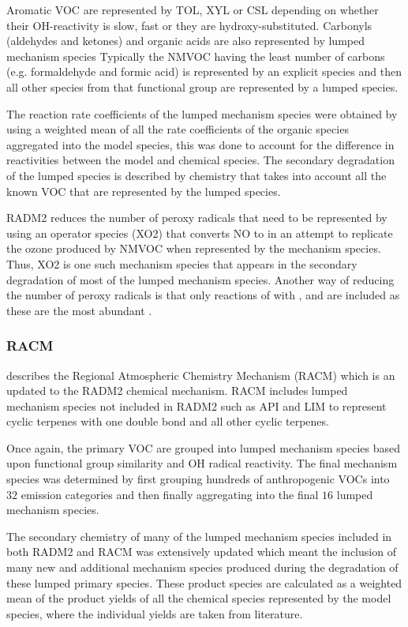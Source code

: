 Aromatic VOC are represented by TOL, XYL or CSL depending on whether their OH-reactivity is slow, fast or they are hydroxy-substituted.
Carbonyls (aldehydes and ketones) and organic acids are also represented by lumped mechanism species
Typically the NMVOC having the least number of carbons (e.g. formaldehyde and formic acid) is represented by an explicit species and then all other species from that functional group are represented by a lumped species.

The reaction rate coefficients of the lumped mechanism species were obtained by using a weighted mean of all the rate coefficients of the organic species aggregated into the model species, this was done to account for the difference in reactivities between the model and chemical species.
The secondary degradation of the lumped species is described by chemistry that takes into account all the known VOC that are represented by the lumped species.

RADM2 reduces the number of peroxy radicals that need to be represented by using an operator species (XO2) that converts NO to  in an attempt to replicate the ozone produced by NMVOC when represented by the mechanism species.
Thus, XO2 is one such mechanism species that appears in the secondary degradation of most of the lumped mechanism species.
Another way of reducing the number of peroxy radicals is that only reactions of  with ,  and  are included as these are the most abundant .

\subsubsection{RACM}
\citet{Stockwell:1997} describes the Regional Atmospheric Chemistry Mechanism (RACM) which is an updated to the RADM2 chemical mechanism.
RACM includes lumped mechanism species not included in RADM2 such as API and LIM to represent cyclic terpenes with one double bond and all other cyclic terpenes.

Once again, the primary VOC are grouped into lumped mechanism species based upon functional group similarity and OH radical reactivity. 
The final mechanism species was determined by first grouping hundreds of anthropogenic VOCs into $32$ emission categories and then finally aggregating into the final $16$ lumped mechanism species. 

The secondary chemistry of many of the lumped mechanism species included in both RADM2 and RACM was extensively updated which meant the inclusion of many new and additional mechanism species produced during the degradation of these lumped primary species.
These product species are calculated as a weighted mean of the product yields of all the chemical species represented by the model species, where the individual yields are taken from literature. 

